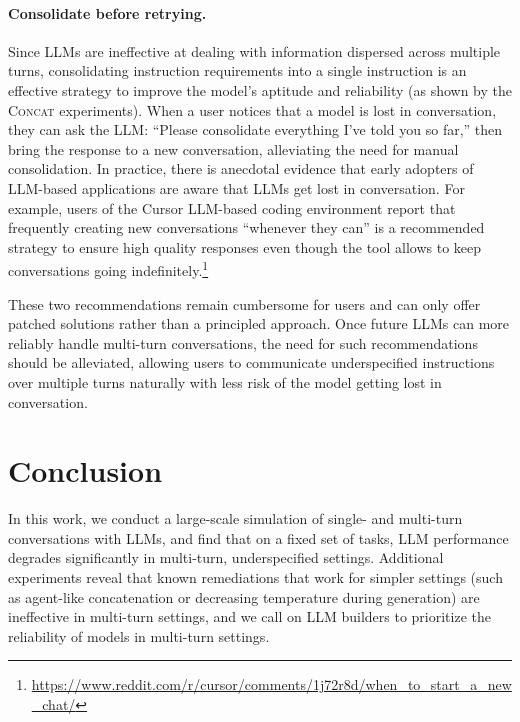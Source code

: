 \documentclass{article}
\newcommand{\concatt}{\textsc{Concat}\xspace}
\begin{document}
\paragraph{Consolidate before retrying.} Since LLMs are ineffective at dealing with information dispersed across multiple turns, consolidating instruction requirements into a single instruction is an effective strategy to improve the model's aptitude and reliability (as shown by the \concatt experiments).
When a user notices that a model is lost in conversation, they can ask the LLM: ``Please consolidate everything I've told you so far,'' then bring the response to a new conversation, alleviating the need for manual consolidation. In practice, there is anecdotal evidence that early adopters of LLM-based applications are aware that LLMs get lost in conversation. For example, users of the Cursor LLM-based coding environment report that frequently creating new conversations ``whenever they can'' is a recommended strategy to ensure high quality responses even though the tool allows to keep conversations going indefinitely.\footnote{\url{https://www.reddit.com/r/cursor/comments/1j72r8d/when_to_start_a_new_chat/}} %

These two recommendations remain cumbersome for users and can only offer patched solutions rather than a principled approach. Once future LLMs can more reliably handle multi-turn conversations, the need for such recommendations should be alleviated, allowing users to communicate underspecified instructions over multiple turns naturally with less risk of the model getting lost in conversation.

\section{Conclusion}\label{sec:conclusion}

In this work, we conduct a large-scale simulation of single- and multi-turn conversations with LLMs, and find that on a fixed set of tasks, LLM performance degrades significantly in multi-turn, underspecified settings. Additional experiments reveal that known remediations that work for simpler settings (such as agent-like concatenation or decreasing temperature during generation) are ineffective in multi-turn settings, and we call on LLM builders to prioritize the reliability of models in multi-turn settings.
\end{document}
